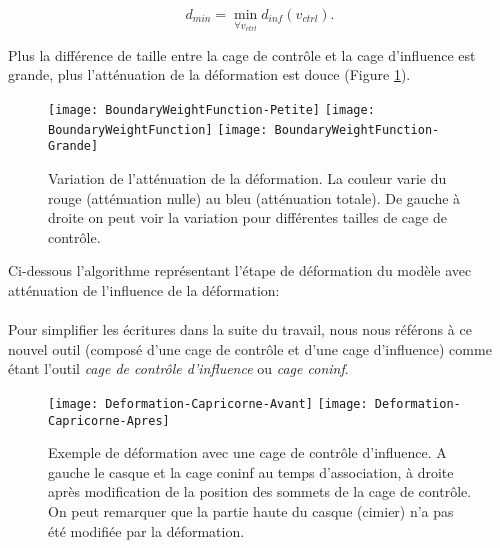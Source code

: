 \begin{equation}
  d_{min} = \min_{\forall v_{ctrl}} d_{inf}(v_{ctrl}).
\end{equation}

Plus la différence de taille entre la cage de contrôle et la cage d'influence
est grande, plus l'atténuation de la déformation est douce (Figure
\ref{MELBou}).

\begin{figure}[ht]
  \begin{center}
    \texttt{[image: BoundaryWeightFunction-Petite]}
    \texttt{[image: BoundaryWeightFunction]}
    \texttt{[image: BoundaryWeightFunction-Grande]}

    \caption[Variation de l'atténuation de la déformation] {Variation de
l'atténuation de la déformation. La couleur varie du rouge (atténuation nulle)
au bleu (atténuation totale). De gauche à droite on peut voir la variation
pour différentes tailles de cage de contrôle.}

    \label{MELBou}
  \end{center}
\end{figure}

Ci-dessous l'algorithme représentant l'étape de déformation du modèle avec
atténuation de l'influence de la déformation: \\

 \\

Pour simplifier les écritures dans la suite du travail, nous nous référons à
ce nouvel outil (composé d'une cage de contrôle et d'une cage d'influence)
comme étant l'outil \textit{cage de contrôle d'influence} ou \textit{cage
coninf}.

\begin{figure}[ht]
  \begin{center}
    \texttt{[image: Deformation-Capricorne-Avant]}
    \texttt{[image: Deformation-Capricorne-Apres]}

    \caption[Exemple de déformation cage de contrôle d'influence] {Exemple de
déformation avec une cage de contrôle d'influence. A gauche le casque et la
cage coninf au temps d'association, à droite après modification de la position
des sommets de la cage de contrôle. On peut remarquer que la partie haute du
casque (cimier) n'a pas été modifiée par la déformation.}

  \end{center}
\end{figure}

